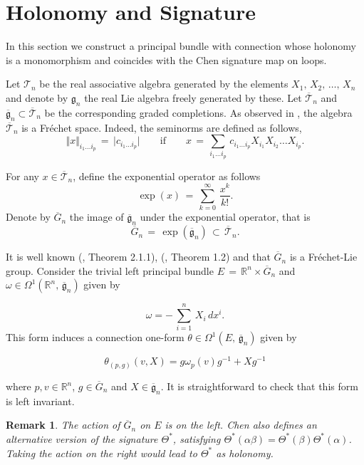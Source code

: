 \documentclass{amsart}
\newcommand{\R}{{\mathbb R}}
\newtheorem{remark}{Remark}
\begin{document}
\section{Holonomy and Signature}\label{section_holonomy_signature}

In this section we construct a principal bundle with connection whose holonomy is a monomorphism and coincides with the Chen signature map on loops.




Let $\mathcal T_n$ be the real associative algebra generated by the elements $X_1,\,X_2,\,\ldots,\,X_n$ and denote by $\mathfrak{g}_n$ the real Lie algebra freely generated by these.
Let $\overline{\mathcal T}_n$ and  $\overline{\mathfrak g}_n\subset \overline{\mathcal T}_n$ be the corresponding graded completions. As observed in \cite{Neretin}, the algebra $\overline{\mathcal T}_n$  is a Fr\'echet space. Indeed, the seminorms are defined as follows,
$$\Vert x\Vert_{i_1\ldots i_p}\,=\, \vert c_{i_1\ldots i_p}\vert\qquad\mathrm{if}\qquad x\,=\,\sum_{i_1\ldots i_p}\, c_{i_1\ldots {i_p}}     X_{i_1}X_{i_2} \ldots X_{i_p}.$$



For any $x\in \overline{\mathcal T}_n$, define the exponential operator as follows
$$\exp(x)\,=\,\sum_{k=0}^{\infty}\,\frac{x^k}{k!}.$$
Denote by $\overline{G}_n$ the image of $\overline{\mathfrak g}_n$ under the exponential operator, that is
$$\overline{G}_n\,=\,\exp\left(\overline{\mathfrak g}_n\right)\,\subset\,\overline{\mathcal T}_n.$$

It is well known (\cite{Lyons1}, Theorem 2.1.1), (\cite{Neretin}, Theorem 1.2)  and \cite{Reutenauer}  that $\overline{G}_n$  is a Fr\'echet-Lie group.
Consider the trivial left principal bundle $E\,=\,\R^n\times \overline{G}_n$ and 
$\omega \in \Omega^1(\R^n,\,\overline{\mathfrak{g}}_n)$ given by 

$$\omega=-\,\sum_{i=1}^n\,X_i\,dx^i.$$
This form induces a connection one-form   $\theta\in  \Omega^1(E,\,\overline{\mathfrak{g}}_n)$ given by 




\[\theta_{(p, g)}(v, X)=g\omega_p(v)g^{-1}+Xg^{-1}\]

where $p,v\in \R^{n}$,  $g\in \overline{G}_n$ and   $X\in \overline{\mathfrak{g}}_n$.  It is straightforward to check that this form is left invariant.

\begin{remark}\label{leftaction} The action of $\overline{G}_n$ on $E$ is on the left. Chen \cite{Chen2prima} also defines an alternative version of the signature $\Theta^{*}$, satisfying    
$\Theta^{*}(\alpha\beta)=\Theta^{*}(\beta)\Theta^{*}(\alpha)$. Taking the action on the right would lead to $\Theta^{*}$ as holonomy.

\end{remark}
\medskip
\end{document}
